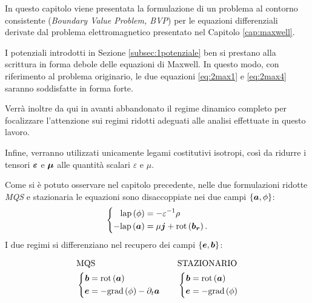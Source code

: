 


\label{cap:bvp}

In questo capitolo viene presentata la formulazione di un problema al contorno consistente (\textit{Boundary Value Problem, BVP})  per le equazioni differenziali derivate dal problema elettromagnetico presentato nel Capitolo \ref{cap:maxwell}. 


I potenziali introdotti in Sezione \ref{subsec:1potenziale} ben si prestano alla scrittura in forma debole delle equazioni di Maxwell. In questo modo, con riferimento al problema originario, le due equazioni \eqref{eq:2max1} e \eqref{eq:2max4} saranno soddisfatte in forma forte.

Verrà inoltre da qui in avanti abbandonato il regime dinamico completo per focalizzare l'attenzione sui regimi ridotti adeguati alle analisi effettuate in questo lavoro.

Infine, verranno utilizzati unicamente legami costitutivi isotropi, così da ridurre i tensori $\boldsymbol{\varepsilon}$ e $\boldsymbol{\mu}$ alle quantità scalari $\varepsilon$ e $\mu$.

Come si è potuto osservare nel capitolo precedente, nelle due formulazioni ridotte \textit{MQS} e stazionaria le equazioni sono disaccoppiate nei due campi $\left\{\boldsymbol{a},\phi\right\}$:
\begin{equation}
\left\{
\label{eq:3potqss}
\begin{aligned}
\text{lap}\left({\phi}\right) &= -\varepsilon^{-1} \rho\\
-\text{lap}\left(\boldsymbol{a}\right) &= \mu\boldsymbol{j}+\text{rot}\left(\boldsymbol{b_r}\right).
\end{aligned}
\right.
\end{equation}
I due regimi si differenziano nel recupero dei campi $\left\{\boldsymbol{e},\boldsymbol{b}\right\}$:

\begin{equation}
\label{eq:2recuperoqss}
\begin{aligned}
&\text{MQS}\\
&\left\{
\begin{aligned}
\boldsymbol{b}&=\text{rot} \left(\boldsymbol{a}\right)\\
\boldsymbol{e} &= -\text{grad}\left(\phi\right) -\partial_t \boldsymbol{a}
\end{aligned}
\right.
\end{aligned}
\qquad
\begin{aligned}
&\text{STAZIONARIO}\\
&\left\{
\begin{aligned}
\boldsymbol{b}&=\text{rot} \left(\boldsymbol{a}\right)\\
\boldsymbol{e} &= -\text{grad}\left(\phi\right)
\end{aligned}
\right.
\end{aligned}
\end{equation}

